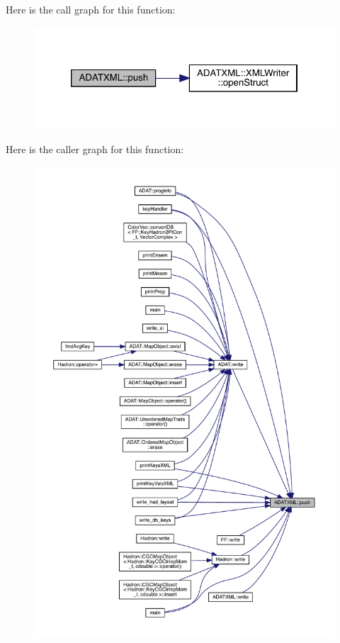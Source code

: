 Here is the call graph for this function\+:\nopagebreak
\begin{figure}[H]
\begin{center}
\leavevmode
\includegraphics[width=320pt]{d7/da0/namespaceADATXML_a1e8531ea0cb1a302d918f3b427969425_cgraph}
\end{center}
\end{figure}
Here is the caller graph for this function\+:\nopagebreak
\begin{figure}[H]
\begin{center}
\leavevmode
\includegraphics[width=350pt]{d7/da0/namespaceADATXML_a1e8531ea0cb1a302d918f3b427969425_icgraph}
\end{center}
\end{figure}
\mbox{\label{namespaceADATXML_a569ed4d03ded383a8aaf0ce90b7c80ba}} 
